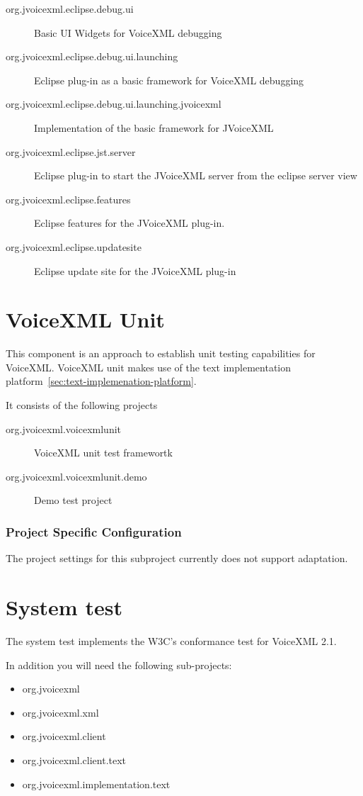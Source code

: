 \documentclass[11pt,a4paper]{article}
\begin{document}
\begin{description}
\item[org.jvoicexml.eclipse.debug.ui] Basic UI Widgets for VoiceXML debugging
\item[org.jvoicexml.eclipse.debug.ui.launching] Eclipse plug-in as a basic
framework for VoiceXML debugging
\item[org.jvoicexml.eclipse.debug.ui.launching.jvoicexml] Implementation of the
basic framework for JVoiceXML
\item[org.jvoicexml.eclipse.jst.server] Eclipse plug-in to start the JVoiceXML
server from the eclipse server view
\item[org.jvoicexml.eclipse.features] Eclipse features for the JVoiceXML
plug-in.
\item[org.jvoicexml.eclipse.updatesite] Eclipse update site for the
JVoiceXML plug-in
\end{description}

\section{VoiceXML Unit}
\label{voicexml-unit}

This component is an approach to establish unit testing capabilities for
VoiceXML. VoiceXML unit makes use of the text implementation platform~\ref{sec:text-implemenation-platform}.

It consists of the following projects
\begin{description}
\item[org.jvoicexml.voicexmlunit] VoiceXML unit test framewortk
\item[org.jvoicexml.voicexmlunit.demo] Demo test project
\end{description}

\subsubsection{Project Specific Configuration}

The project settings for this subproject currently does not support adaptation.

\section{System test}

The system test implements the W3C's conformance test for VoiceXML 2.1.

In addition you will need the following sub-projects:
\begin{itemize}
\item org.jvoicexml
\item org.jvoicexml.xml
\item org.jvoicexml.client
\item org.jvoicexml.client.text
\item org.jvoicexml.implementation.text
\end{itemize} 
\end{document}
